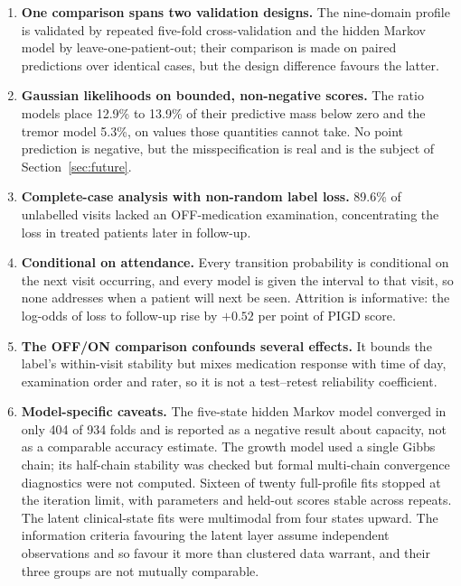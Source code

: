 \documentclass[11pt]{article}
\begin{document}
\begin{enumerate}
\item \textbf{One comparison spans two validation designs.} The nine-domain
profile is validated by repeated five-fold cross-validation and the hidden Markov
model by leave-one-patient-out; their comparison is made on paired predictions
over identical cases, but the design difference favours the latter.

\item \textbf{Gaussian likelihoods on bounded, non-negative scores.} The ratio
models place 12.9\% to 13.9\% of their predictive mass below zero and the tremor
model 5.3\%, on values those quantities cannot take. No point prediction is
negative, but the misspecification is real and is the subject of
Section~\ref{sec:future}.

\item \textbf{Complete-case analysis with non-random label loss.} 89.6\% of
unlabelled visits lacked an OFF-medication examination, concentrating the loss in
treated patients later in follow-up.

\item \textbf{Conditional on attendance.} Every transition probability is
conditional on the next visit occurring, and every model is given the interval to
that visit, so none addresses when a patient will next be seen. Attrition is
informative: the log-odds of loss to follow-up rise by $+0.52$ per point of PIGD
score.

\item \textbf{The OFF/ON comparison confounds several effects.} It bounds the
label's within-visit stability but mixes medication response with time of day,
examination order and rater, so it is not a test--retest reliability coefficient.

\item \textbf{Model-specific caveats.} The five-state hidden Markov model
converged in only 404 of 934 folds and is reported as a negative result about
capacity, not as a comparable accuracy estimate. The growth model used a single
Gibbs chain; its half-chain stability was checked but formal multi-chain
convergence diagnostics were not computed. Sixteen of twenty full-profile fits
stopped at the iteration limit, with parameters and held-out scores stable across
repeats. The latent clinical-state fits were multimodal from four states upward.
The information criteria favouring the latent layer assume independent
observations and so favour it more than clustered data warrant, and their three
groups are not mutually comparable.


\end{enumerate}
\end{document}
